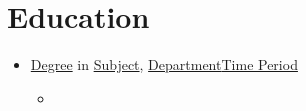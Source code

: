 \section{Education}
\begin{itemize}
	\item {}
	      {\underline{Degree} in \underline{Subject}, \underline{Department}}{\underline{Time Period}}
	      \iffullversion
	      \else
		      \begin{itemize}
			      \item {}
		      \end{itemize}
	      \fi
\end{itemize}